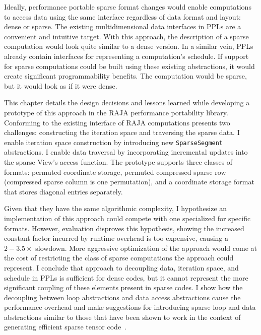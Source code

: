 Ideally, performance portable sparse format changes would enable computations to access data using the same interface regardless of data format and layout: dense or sparse.
The existing multidimensional data interfaces in PPLs are a convenient and intuitive target.
With this approach, the description of a sparse computation would look quite similar to a dense version.
In a similar vein, PPLs already contain interfaces for representing a computation's schedule.
If support for sparse computations could be built using these existing abstractions, it would create significant programmability benefits.
The computation would be sparse, but it would look as if it were dense.
 
This chapter details the design decisions and lessons learned while developing a prototype of this approach in the RAJA performance portability library.
Conforming to the existing interface of RAJA computations presents two challenges: constructing the iteration space and traversing the sparse data.
I enable iteration space construction by introducing new \verb.SparseSegment. abstractions.
I enable data traversal by incorporating incremental updates into the sparse View's access function.
The prototype supports three classes of formats: permuted coordinate storage, permuted compressed sparse row (compressed sparse column is one permutation), and a coordinate storage format that stores diagonal entries separately.

Given that they have the same algorithmic complexity, I hypothesize an implementation of this approach could compete with one specialized for specific formats.
However, evaluation disproves this hypothesis, showing the increased constant factor incurred by runtime overhead is too expensive, causing a $2-3.5\times$ slowdown.
More aggressive optimization of the approach would come at the cost of restricting the class of sparse computations the approach could represent.
I conclude that approach to decoupling data, iteration space, and schedule in PPLs is sufficient for dense codes, but it cannot represent the more significant coupling of these elements present in sparse codes.
I show how the decoupling between loop abstractions and data access abstractions cause the performance overhead and make suggestions for introducing sparse loop and data abstractions similar to those that have been shown to work in the context of generating efficient sparse tensor code~\cite{kjolstad2017tensor}. 

